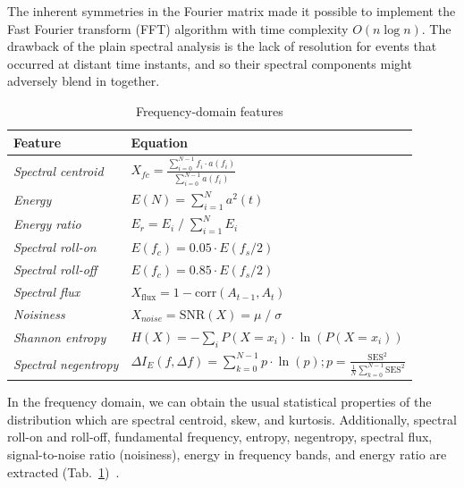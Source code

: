 The inherent symmetries in the Fourier matrix made it possible to implement the Fast Fourier transform (FFT) algorithm with time complexity $O(n \log n)$. The drawback of the plain spectral analysis is the lack of resolution for events that occurred at distant time instants, and so their spectral components might adversely blend in together. 

\begin{table}[ht]
\renewcommand{\arraystretch}{2}
\centering
\begin{tabular}{|l|l|}
\hline
\textbf{Feature}           & \textbf{Equation}                                                                                                  \\ \hline
\textit{Spectral centroid} & $ X_{fc} = \frac{\sum_{i = 0}^{N - 1}{f_i \cdot a(f_i)}}{\sum_{i = 0}^{N - 1}{a(f_i)}}$                   \\ \hline 
\textit{Energy}            & $ E(N) = \sum_{i = 1}^{N} a^2(t) $                                                                    \\ \hline \textit{Energy ratio}                & $E_r = E_i \;/\; \sum_{i = 1}^{N}{E_i} $                                                        \\ \hline
\textit{Spectral roll-on} & $ E(f_c) = 0.05 \cdot E(f_s / 2) $ \\ \hline                    
\textit{Spectral roll-off} & $ E(f_c) = 0.85 \cdot E(f_s / 2) $                                                   \\ \hline
\textit{Spectral flux}     & $X_{\mathrm{flux}} = 1 - \mathrm{corr}(A_{t-1}, A_t)$ \\ \hline 
\textit{Noisiness}                   & $X_{noise} = \mathrm{SNR}(X) = \mu \;/\; \sigma $                             \\ \hline
\textit{Shannon entropy}      & $H(X) = - \sum_{i} P(X = x_i) \cdot \ln(P(X = x_i)) $                                                  \\ \hline
\textit{Spectral negentropy}      & $\Delta I_E(f, \Delta f) = \sum_{k = 0}^{N - 1}{p \cdot \ln(p); p = \frac{\mathrm{SES}^2}{\frac{1}{N} \sum_{k=0}^{N-1} \mathrm{SES}^2}}$                                                \\ \hline
\end{tabular}
\caption{Frequency-domain features}
\label{tab:fd-features}
\end{table}

In the frequency domain, we can obtain the usual statistical properties of the distribution which are spectral centroid, skew, and kurtosis. Additionally, spectral roll-on and roll-off, fundamental frequency, entropy, negentropy, spectral flux, signal-to-noise ratio (noisiness), energy in frequency bands, and energy ratio are extracted (Tab.~\ref{tab:fd-features})~\cite{peeters_large_2004}. 

